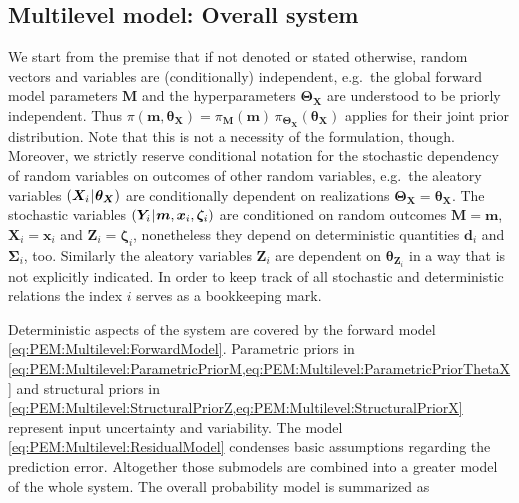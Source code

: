 \subsection{Multilevel model: Overall system} \label{sec:PEM:Multilevel:Overall}
We start from the premise that if not denoted or stated otherwise, random vectors and variables are (conditionally) independent,
e.g.\ the global forward model parameters \(\bm{M}\) and the hyperparameters \(\bm{\Theta}_{\bm{X}}\) are understood to be priorly independent.
Thus \(\pi(\bm{m},\bm{\theta}_{\bm{X}}) = \pi_{\bm{M}} (\bm{m}) \, \pi_{\bm{\Theta}_{\bm{X}}} (\bm{\theta}_{\bm{X}})\) applies for their joint prior distribution.
Note that this is not a necessity of the formulation, though.
Moreover, we strictly reserve conditional notation for the stochastic dependency of random variables on outcomes of other random variables,
e.g.\ the aleatory variables \((\bm{X}_i {\:\!}|{\:\!} \bm{\theta}_{\bm{X}})\) are conditionally dependent on realizations \(\bm{\Theta}_{\bm{X}}=\bm{\theta}_{\bm{X}}\).
The stochastic variables \((\bm{Y}_i {\:\!}|{\:\!} \bm{m},\bm{x}_i,\bm{\zeta}_i)\) are conditioned on random outcomes \(\bm{M}=\bm{m}\), \(\bm{X}_i=\bm{x}_i\) and \(\bm{Z}_i=\bm{\zeta}_i\),
nonetheless they depend on deterministic quantities \(\bm{d}_i\) and \(\bm{\Sigma}_i\), too.
Similarly the aleatory variables \(\bm{Z}_i\) are dependent on \(\bm{\theta}_{\bm{Z}_i}\) in a way that is not explicitly indicated.
In order to keep track of all stochastic and deterministic relations the index \(i\) serves as a bookkeeping mark.
\par %
Deterministic aspects of the system are covered by the forward model \cref{eq:PEM:Multilevel:ForwardModel}.
Parametric priors in \cref{eq:PEM:Multilevel:ParametricPriorM,eq:PEM:Multilevel:ParametricPriorThetaX} and structural priors in
\cref{eq:PEM:Multilevel:StructuralPriorZ,eq:PEM:Multilevel:StructuralPriorX} represent input uncertainty and variability.
The model \cref{eq:PEM:Multilevel:ResidualModel} condenses basic assumptions regarding the prediction error.
Altogether those submodels are combined into a greater model of the whole system.
The overall probability model is summarized as
